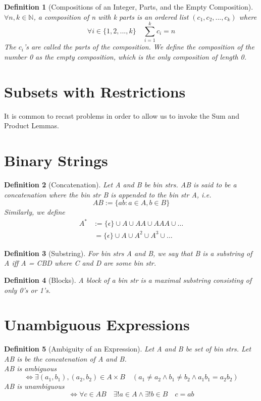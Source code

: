\documentclass[11pt, oneside]{book}
\theoremstyle{break}
\newtheorem{defn}{Definition}[section]
\newcommand{\bb}[1]{\mathbb{#1}}		%
\begin{document}
\begin{defn}[Compositions of an Integer, Parts, and the Empty Composition]
	$\forall n,k \in \bb{N}$, a composition of n with k parts is an ordered list $(c_1, c_2, ..., c_k)$ where
	\[
		\forall i \in \{1, 2, ...,k\} \quad \sum_{i=1}^{k}c_i = n
	\]
	The $c_i$'s are called the parts of the composition.
	We define the composition of the number 0 as the empty composition, which is the only composition of length 0.
\end{defn}


\section{Subsets with Restrictions}

It is common to recast problems in order to allow us to invoke the Sum and Product Lemmas.


\section{Binary Strings}

\begin{defn}[Concatenation]
	Let A and B be bin strs. AB is said to be a concatenation where the bin str B is appended to the bin str A, i.e.
	\[
		AB := \{ab : a \in A, b \in B\}
	\]
	Similarly, we define
	\begin{align*}
		A^* &:= \{\epsilon\} \cup A \cup AA \cup AAA \cup \hdots\\
			&\,= \{\epsilon\} \cup A \cup A^2 \cup A^3 \cup \hdots
	\end{align*}
\end{defn}

\begin{defn}[Substring]
	For bin strs A and B, we say that B is a substring of A iff A = CBD where C and D are some bin str.
\end{defn}

\begin{defn}[Blocks]
	A block of a bin str is a maximal substring consisting of only 0's or 1's.
\end{defn}


\section{Unambiguous Expressions}

\begin{defn}[Ambiguity of an Expression]
	Let A and B be set of bin strs. Let AB is be the concatenation of A and B.\\
	AB is ambiguous
	\[
		\iff \exists(a_1, b_1), (a_2, b_2) \in A \times B \quad (a_1 \neq a_2 \land b_1 \neq b_2 \land a_1b_1 = a_2b_2)
	\]
	AB is unambiguous
	\[
		\iff \forall c \in AB \quad \exists! a \in A \land \exists! b \in B \quad c = ab
	\]
\end{defn}
\end{document}
